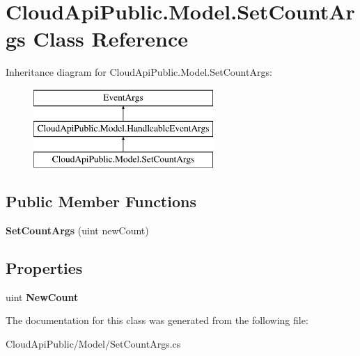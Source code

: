 \hypertarget{class_cloud_api_public_1_1_model_1_1_set_count_args}{\section{Cloud\-Api\-Public.\-Model.\-Set\-Count\-Args Class Reference}
\label{class_cloud_api_public_1_1_model_1_1_set_count_args}
}
Inheritance diagram for Cloud\-Api\-Public.\-Model.\-Set\-Count\-Args\-:\begin{figure}[H]
\begin{center}
\leavevmode
\includegraphics[height=3.000000cm]{class_cloud_api_public_1_1_model_1_1_set_count_args}
\end{center}
\end{figure}
\subsection*{Public Member Functions}
\begin{DoxyCompactItemize}
\item 
\hypertarget{class_cloud_api_public_1_1_model_1_1_set_count_args_ad3e7c7199068e646e1143bc7a087065f}{{\bfseries Set\-Count\-Args} (uint new\-Count)}\label{class_cloud_api_public_1_1_model_1_1_set_count_args_ad3e7c7199068e646e1143bc7a087065f}

\end{DoxyCompactItemize}
\subsection*{Properties}
\begin{DoxyCompactItemize}
\item 
\hypertarget{class_cloud_api_public_1_1_model_1_1_set_count_args_ad41659b1aea876f631ad6e745006f1ee}{uint {\bfseries New\-Count}}\label{class_cloud_api_public_1_1_model_1_1_set_count_args_ad41659b1aea876f631ad6e745006f1ee}

\end{DoxyCompactItemize}


The documentation for this class was generated from the following file\-:\begin{DoxyCompactItemize}
\item 
Cloud\-Api\-Public/\-Model/Set\-Count\-Args.\-cs\end{DoxyCompactItemize}
